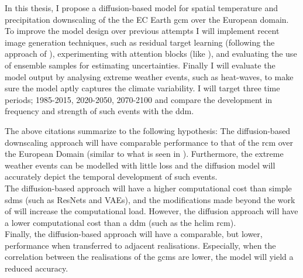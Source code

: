 In this thesis, I propose a diffusion-based model for spatial temperature and precipitation \gls{downscaling} of the the EC Earth \gls{gcm} over the European domain. To improve the model design over previous attempts I will implement recent image generation techniques, such as residual target learning (following the approach of \cite{tomasi}), experimenting with attention blocks (like \cite{marie}), and evaluating the use of ensemble samples for estimating uncertainties. Finally I will evaluate the model output by analysing extreme weather events, such as heat-waves, to make sure the model aptly captures the climate variability. I will target three time periods; 1985-2015, 2020-2050, 2070-2100 and compare the development in frequency and strength of such events with the \gls{ddm}.

The above citations summarize to the following hypothesis:
The diffusion-based \gls{downscaling} approach will have comparable performance to that of the \gls{rcm} over the European Domain (similar to what is seen in \cite{tomasi}). Furthermore, the extreme weather events can be modelled with little loss and the diffusion model will accurately depict the temporal development of such events. \\
The diffusion-based approach will have a higher computational cost than simple \glspl{sdm} (such as ResNets and VAEs), and the modifications made beyond the work of \cite{tomasi} will increase the computational load. However, the diffusion approach will have a lower computational cost than a \gls{ddm} (such as the \gls{hclim} \gls{rcm}). \\
Finally, the diffusion-based approach will have a comparable, but lower, performance when transferred to adjacent \glspl{realisation}. Especially, when the correlation between the \glspl{realisation} of the \glspl{gcm} are lower, the model will yield a reduced accuracy. 

